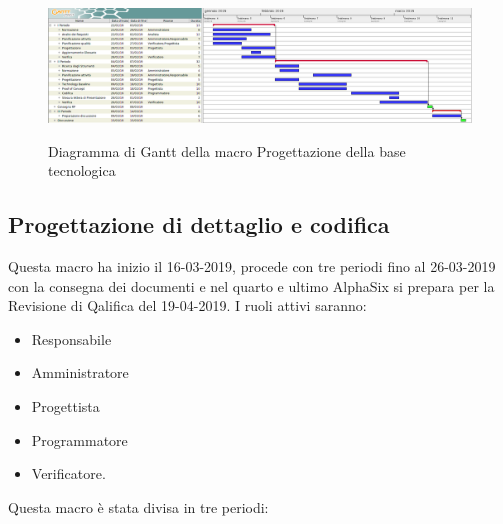 				\begin{figure}[H]
					\centering
					\includegraphics{img/Progettazione_della_base_tecnologica.png}\\
					\caption{Diagramma di Gantt della macro Progettazione della base tecnologica}
				\end{figure}

        \subsection{Progettazione di dettaglio e codifica}
        Questa macro ha inizio il 16-03-2019, procede con tre periodi fino al 26-03-2019 con la consegna dei documenti e nel
        quarto e ultimo AlphaSix si prepara per la Revisione di Qalifica del 19-04-2019. I ruoli attivi saranno: 
        \begin{itemize}
            \item Responsabile
            \item Amministratore
            \item Progettista
            \item Programmatore
            \item Verificatore.
        \end{itemize}
        Questa macro è stata divisa in tre periodi:
